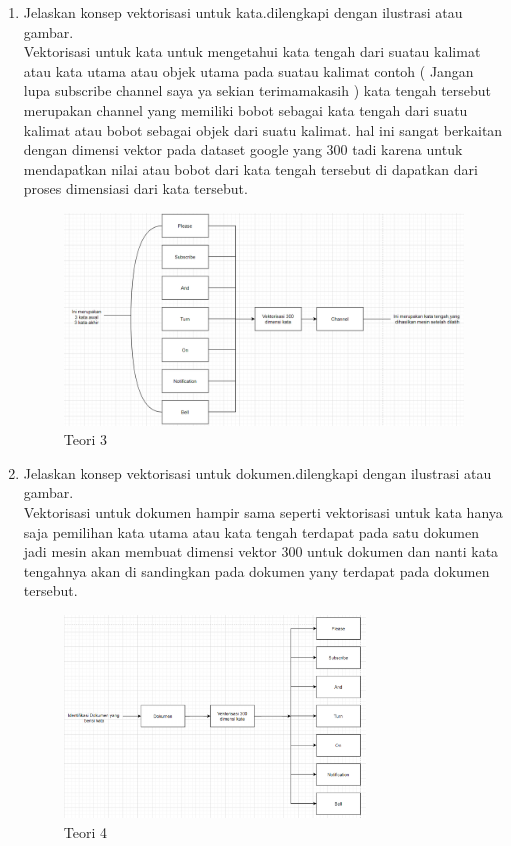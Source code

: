 \begin{enumerate}
\item Jelaskan konsep vektorisasi untuk kata.dilengkapi dengan ilustrasi atau gambar.
	\hfill\\
	Vektorisasi untuk kata untuk mengetahui kata tengah dari suatau kalimat atau kata utama atau objek utama pada suatau kalimat contoh ( Jangan lupa subscribe channel saya ya sekian terimamakasih ) kata tengah tersebut merupakan channel yang memiliki bobot sebagai kata tengah dari suatu kalimat atau bobot sebagai objek dari suatu kalimat. hal ini sangat berkaitan dengan dimensi vektor pada dataset google yang 300 tadi karena untuk mendapatkan nilai atau bobot dari kata tengah tersebut di dapatkan dari proses dimensiasi dari kata tersebut.
\begin{figure}[H]
    \includegraphics[width=12cm]{figures/1174084/5/teori3.png}
    \centering
    \caption{Teori 3}
\end{figure}

\item Jelaskan konsep vektorisasi untuk dokumen.dilengkapi dengan ilustrasi atau gambar.
\hfill\\
	Vektorisasi untuk dokumen hampir sama seperti vektorisasi untuk kata hanya saja pemilihan kata utama atau kata tengah terdapat pada satu dokumen jadi mesin akan membuat dimensi vektor 300 untuk dokumen dan nanti kata tengahnya akan di sandingkan pada dokumen yany terdapat pada dokumen tersebut.	
\begin{figure}[H]
    \includegraphics[width=8cm]{figures/1174084/5/teori4.png}
    \centering
    \caption{Teori 4}
\end{figure}


\end{enumerate}
